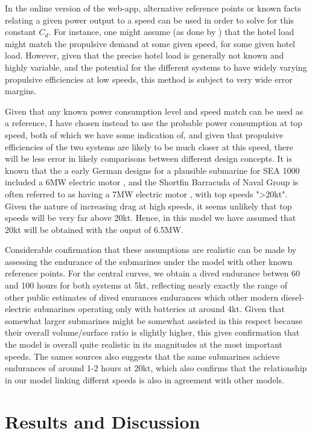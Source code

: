 \documentclass{article}\usepackage[]{graphicx}\usepackage[]{color}
\begin{document}
In the online version of the web-app, alternative reference points or known facts relating a given power output to a speed can be used in order to solve for this constant $C_d$.  For instance, one might assume (as done by \cite{davies2017}) that the hotel load might match the propulsive demand at some given speed, for some given hotel load.  However, given that the precise hotel load is generally not known and highly variable, and the potential for the different systems to have widely varying propulsive efficiencies at low speeds, this method is subject to very wide error margins.

Given that any known power consumption level and speed match can be used as a reference, I have chosen instead to use the probable power consumption at top speed, both of which we have some indication of, and given that propulsive efficiencies of the two systems are likely to be much closer at this speed, there will be less error in likely comparisons between different design concepts.  It is known that the a early German designs for a plausible submarine for SEA 1000 included a 6MW electric motor \parencite{patrick2012}, and the Shortfin Barracuda of Naval Group is often referred to as having a 7MW electric motor \parencite{ohff2017} \parencite{coates2016}, with top speeds ">20kt".  Given the nature of increasing drag at high speeds, it seems unlikely that top speeds will be very far above 20kt. Hence, in this model we have assumed that 20kt will be obtained with the ouput of 6.5MW.

Considerable confirmation that these assumptions are realistic can be made by assessing the endurance of the submarines under the model with other known reference points.  For the central curves, we obtain a dived endurance betwen 60 and 100 hours for both systems at 5kt, reflecting nearly exactly the range of other public estimates of dived enurances endurances which other modern diesel-electric submarines operating only with batteries \parencite[3]{buckingham2008submarine} at around 4kt.  Given that somewhat larger submarines might be somewhat assisted in this respect because their overall volume/surface ratio is slightly higher, this gives confirmation that the model is overall quite realistic in its magnitudes at the most important speeds.  The sames sources also suggests that the same submarines achieve endurances of around 1-2 hours at 20kt, which also confirms that the relationship in our model linking differnt speeds is also in agreement with other models.

\section{Results and Discussion}
\end{document}
